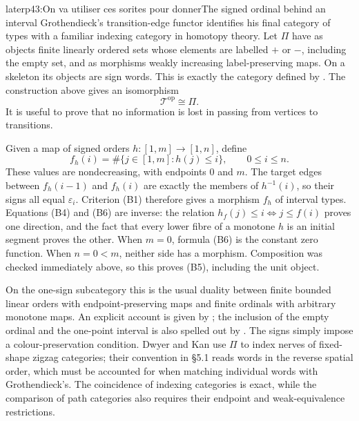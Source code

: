 \begin{dcomment}{later}{p43:On va utiliser ces sorites pour donner}{The signed ordinal behind an interval}
Grothendieck's transition-edge functor identifies his final category of types with a familiar indexing category in homotopy theory. Let $\Pi$ have as objects finite linearly ordered sets whose elements are labelled $+$ or $-$, including the empty set, and as morphisms weakly increasing label-preserving maps. On a skeleton its objects are sign words. This is exactly the category defined by \citet[\S4.1]{DwyerKan1980Calculating}. The construction above gives an isomorphism
\[
                \mathcal T^{\mathrm{op}}\cong\Pi.              \tag{B5}
\]
It is useful to prove that no information is lost in passing from vertices to transitions.

Given a map of signed orders $h:[1,m]\to[1,n]$, define
\[
 f_h(i)=\#\{j\in[1,m]:h(j)\leq i\},\qquad 0\leq i\leq n.
                                                               \tag{B6}
\]
These values are nondecreasing, with endpoints $0$ and $m$. The target edges between $f_h(i-1)$ and $f_h(i)$ are exactly the members of $h^{-1}(i)$, so their signs all equal $\varepsilon_i$. Criterion (B1) therefore gives a morphism $f_h$ of interval types. Equations (B4) and (B6) are inverse: the relation $h_f(j)\leq i\Longleftrightarrow j\leq f(i)$ proves one direction, and the fact that every lower fibre of a monotone $h$ is an initial segment proves the other. When $m=0$, formula (B6) is the constant zero function. When $n=0<m$, neither side has a morphism. Composition was checked immediately above, so this proves (B5), including the unit object.

On the one-sign subcategory this is the usual duality between finite bounded linear orders with endpoint-preserving maps and finite ordinals with arbitrary monotone maps. An explicit account is given by \citet[\S2.7]{MakkaiZawadowski2001}; the inclusion of the empty ordinal and the one-point interval is also spelled out by \citet{Joyal2008}. The signs simply impose a colour-preservation condition. Dwyer and Kan use $\Pi$ to index nerves of fixed-shape zigzag categories; their convention in \S5.1 reads words in the reverse spatial order, which must be accounted for when matching individual words with Grothendieck's. The coincidence of indexing categories is exact, while the comparison of path categories also requires their endpoint and weak-equivalence restrictions.


\end{dcomment}

